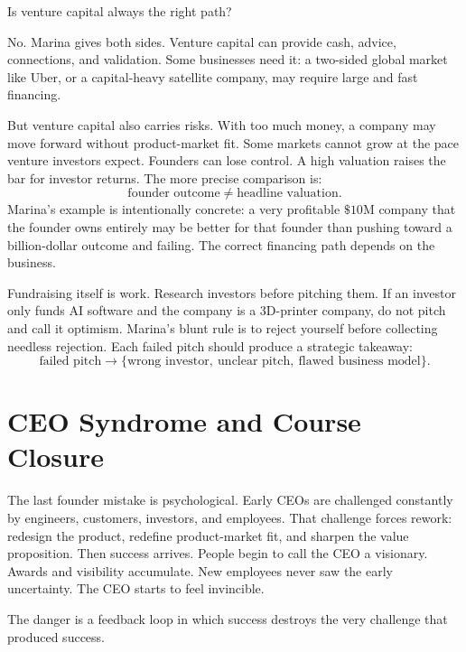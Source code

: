 Is venture capital always the right path?

No. Marina gives both sides. Venture capital can provide cash, advice, connections, and validation. Some businesses need it: a two-sided global market like Uber, or a capital-heavy satellite company, may require large and fast financing.

But venture capital also carries risks. With too much money, a company may move forward without product-market fit. Some markets cannot grow at the pace venture investors expect. Founders can lose control. A high valuation raises the bar for investor returns. The more precise comparison is:
\begin{equation}
\text{founder outcome}
\neq
\text{headline valuation}.
\end{equation}
Marina's example is intentionally concrete: a very profitable \(\$10\text{M}\) company that the founder owns entirely may be better for that founder than pushing toward a billion-dollar outcome and failing. The correct financing path depends on the business.

Fundraising itself is work. Research investors before pitching them. If an investor only funds AI software and the company is a 3D-printer company, do not pitch and call it optimism. Marina's blunt rule is to reject yourself before collecting needless rejection. Each failed pitch should produce a strategic takeaway:
\begin{equation}
\text{failed pitch}
\longrightarrow
\{\text{wrong investor},\ \text{unclear pitch},\ \text{flawed business model}\}.
\end{equation}

\section{CEO Syndrome and Course Closure}

The last founder mistake is psychological. Early CEOs are challenged constantly by engineers, customers, investors, and employees. That challenge forces rework: redesign the product, redefine product-market fit, and sharpen the value proposition. Then success arrives. People begin to call the CEO a visionary. Awards and visibility accumulate. New employees never saw the early uncertainty. The CEO starts to feel invincible.

The danger is a feedback loop in which success destroys the very challenge that produced success.

